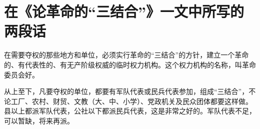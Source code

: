 \section[在《论革命的“三结合”》一文中所写的两段话（一九六七年第五期《红旗》杂志社论）]{在《论革命的“三结合”》一文中所写的两段话}


在需要夺权的那些地方和单位，必须实行革命的“三结合”的方针，建立一个革命的、有代表性的、有无产阶级权威的临时权力机构。这个权力机构的名称，叫革命委员会好。

从上至下，凡要夺权的单位，都要有军队代表或民兵代表参加，组成“三结合”，不论工厂、农村、财贸、文教（大、中、小学）、党政机关及民众团体都要这样做。县以上都派军队代表，公社以下都派民兵代表，这是非常之好的。军队代表不足，可以暂缺，将来再派。

